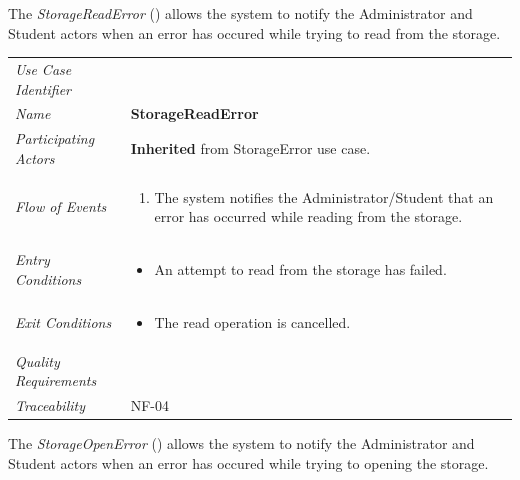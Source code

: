 \documentclass[12pt,letterpaper]{article}
\begin{document}
The {\it StorageReadError} () allows the system to notify the Administrator and Student actors when an error has occured while trying to read from the storage.

\begin{center}
	\begin{tabu} to 
		\toprule
		Use Case Identifier &  \\
		Name & {\bf StorageReadError} \\
		Participating Actors & \textbf{Inherited} from StorageError use case. \\
		Flow of Events & 
		\begin{minipage}[t]{\linewidth}
		    \begin{enumerate}
			    \item The system notifies the Administrator/Student that an error has occurred while reading from the storage.
			\end{enumerate}
		\end{minipage} \\

		Entry Conditions &
		\begin{minipage}[t]{\linewidth}
			\begin{itemize}
			    \item An attempt to read from the storage has failed.
	        \end{itemize}
		\end{minipage} \\

		Exit Conditions &
		\begin{minipage}[t]{\linewidth}
			\begin{itemize}
			    \item The read operation is cancelled.
	        \end{itemize}
		\end{minipage} \\

		Quality Requirements & \\

		Traceability & NF-04 \\
		\toprule
	\end{tabu}
\end{center}

\vspace{1em}
The {\it StorageOpenError} () allows the system to notify the Administrator and Student actors when an error has occured while trying to opening the storage.
\end{document}
